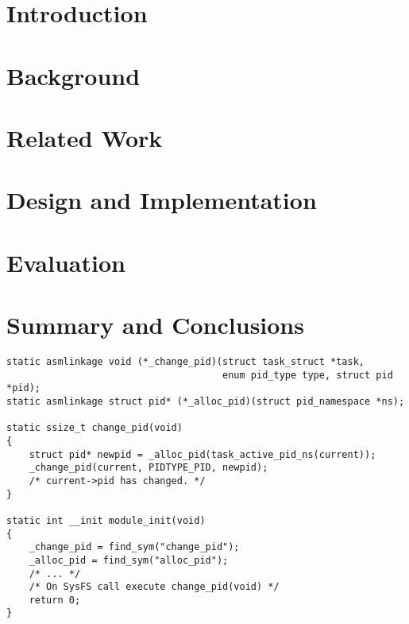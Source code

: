 \documentclass[a4paper,12pt,twoside,openright]{report}
\begin{document}
\pagestyle{empty}
\singlespacing
{}

\restoregeometry
\onehalfspacing

\singlespacing


\setcounter{page}{0}
\pagestyle{plain}
\tableofcontents
\listoffigures
\listoftables

\onehalfspacing


\chapter{Introduction}
\setcounter{page}{1} 


\chapter{Background} 


\chapter{Related Work} 


\chapter{Design and Implementation}
\label{sec:design}


\chapter{Evaluation} 


\chapter{Summary and Conclusions} 



\appendix
\singlespacing



\begin{verbatim}
static asmlinkage void (*_change_pid)(struct task_struct *task, 
                                      enum pid_type type, struct pid *pid);
static asmlinkage struct pid* (*_alloc_pid)(struct pid_namespace *ns);

static ssize_t change_pid(void)
{
    struct pid* newpid = _alloc_pid(task_active_pid_ns(current));
    _change_pid(current, PIDTYPE_PID, newpid);
    /* current->pid has changed. */
}

static int __init module_init(void)
{
    _change_pid = find_sym("change_pid");
    _alloc_pid = find_sym("alloc_pid");
    /* ... */
    /* On SysFS call execute change_pid(void) */
    return 0;
}

\end{verbatim}

 
 

\end{document}
